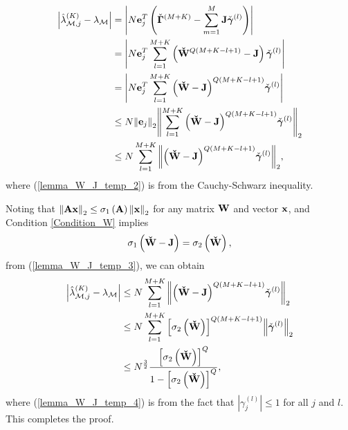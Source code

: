 \documentclass[11pt, draftclsnofoot, onecolumn]{IEEEtran}
\newcommand{\cM}{\mathcal{M}}
\newcommand{\cbgamma}{{\check{\boldsymbol{\gamma}}}}
\newcommand{\cbGamma}{{\check{\boldsymbol{\Gamma}}}}
\newcommand{\cW}{{\check{W}}}
\begin{document}
\begin{align} \notag
\left| {\hat \lambda _{{\cal M},j}^{(K)} - {\lambda _{\cM}}} \right| & = \left| {N{\bf{e}}_j^T\left( {{\cbGamma ^{\left( {M + K} \right)}} - \sum\limits_{m = 1}^M {{\bf{J}}{\cbgamma ^{(l)}}} } \right)} \right|\\ \notag
& = \left| {N{\bf{e}}_j^T\sum\limits_{l = 1}^{M + K} {\left( {{{\bf{\cW}}^{Q\left( {M + K - l + 1} \right)}} - {\bf{J}}} \right){\cbgamma ^{(l)}}} } \right|\\ \notag
& = \left| {N{\bf{e}}_j^T\sum\limits_{l = 1}^{M + K} {{{\left( {{\bf{\cW}} - {\bf{J}}} \right)}^{Q\left( {M + K - l + 1} \right)}}{\cbgamma ^{(l)}}} } \right|\\ \label{lemma_W_J_temp_2}
& \le N{\left\| {{{\bf{e}}_j}} \right\|_2}{\left\| {\sum\limits_{l = 1}^{M + K} {{{\left( {{\bf{\cW}} - {\bf{J}}} \right)}^{Q\left( {M + K - l + 1} \right)}}{\cbgamma ^{(l)}}} } \right\|_2} \\ \label{lemma_W_J_temp_3}
&  \le N\sum\limits_{l = 1}^{M + K} {{{\left\| {{{\left( {{\bf{\cW}} - {\bf{J}}} \right)}^{Q\left( {M + K - l + 1} \right)}}{\cbgamma ^{(l)}}} \right\|}_2}},
\end{align}
where (\ref{lemma_W_J_temp_2}) is from the Cauchy-Schwarz inequality.

Noting that ${\left\| {{\bf{Ax}}} \right\|_2} \le {\sigma _1}\left( {\bf{A}} \right){\left\| {\bf{x}} \right\|_2}$ for any matrix $\bf W$ and vector $\bf x$, and Condition \ref{Condition_W} implies 
\begin{equation}
{\sigma _1}\left( {{\bf{\cW}} - {\bf{J}}} \right) = {\sigma _2}\left( {\bf{\cW}} \right),
\end{equation}
from (\ref{lemma_W_J_temp_3}), we can obtain 
\begin{align} \notag
\left| {\hat \lambda _{{\cal M},j}^{(K)} - {\lambda _{\cM}}} \right| & \le N\sum\limits_{l = 1}^{M + K} {{{\left\| {{{\left( {{\bf{\cW}} - {\bf{J}}} \right)}^{Q\left( {M + K - l + 1} \right)}}{\cbgamma ^{(l)}}} \right\|}_2}} \\ \notag
& \le N\sum\limits_{l = 1}^{M + K} {{{\left[ {{\sigma _2}\left( {\bf{\cW}} \right)} \right]}^{Q\left( {M + K - l + 1} \right)}}{{\left\| {{\cbgamma ^{(l)}}} \right\|}_2}} \\ \label{lemma_W_J_temp_4}
& \le {N^{\frac{3}{2}}}\frac{{{{\left[ {{\sigma _2}\left( {\bf{\cW}} \right)} \right]}^Q}}}{{1 - {{\left[ {{\sigma _2}\left( {\bf{\cW}} \right)} \right]}^Q}}},
\end{align} 
where (\ref{lemma_W_J_temp_4}) is from the fact that $|{\gamma_j ^{(l)}}|\le 1$ for all $j$ and $l$. This completes the proof.




\end{document}
